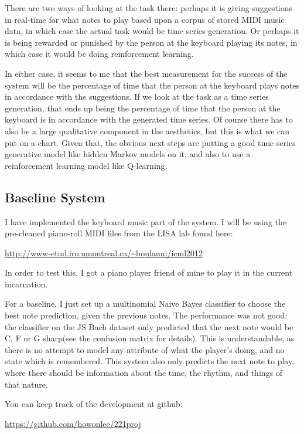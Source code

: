 \documentclass{article}
\begin{document}
There are two ways of looking at the task there: perhaps it is giving suggestions in real-time for what notes to play based upon a corpus of stored MIDI music data, in which case the actual task would be time series generation. Or perhaps it is being rewarded or punished by the person at the keyboard playing its notes, in which case it would be doing reinforcement learning.

In either case, it seems to me that the best measurement for the success of the system will be the percentage of time that the person at the keyboard plays notes in accordance with the suggestions. If we look at the task as a time series generation, that ends up being the percentage of time that the person at the keyboard is in accordance with the generated time series. Of course there has to also be a large qualitative component in the aesthetics, but this is what we can put on a chart. Given that, the obvious next steps are putting a good time series generative model like hidden Markov models on it, and also to use a reinforcement learning model like Q-learning.
\subsection*{Baseline System}
I have implemented the keyboard music part of the system. I will be using the pre-cleaned piano-roll MIDI files from the LISA lab found here:

\url{http://www-etud.iro.umontreal.ca/~boulanni/icml2012}

In order to test this, I got a piano player friend of mine to play it in the current incarnation.

For a baseline, I just set up a multinomial Naive Bayes classifier to choose the best note prediction, given the previous notes. The performance was not good: the classifier on the JS Bach dataset only predicted that the next note would be C, F or G sharp(see the confusion matrix for details). This is understandable, as there is no attempt to model any attribute of what the player's doing, and no state which is remembered. This system also only predicts the next note to play, where there should be information about the time, the rhythm, and things of that nature.

You can keep track of the development at github:

\url{https://github.com/howonlee/221proj}
\end{document}
